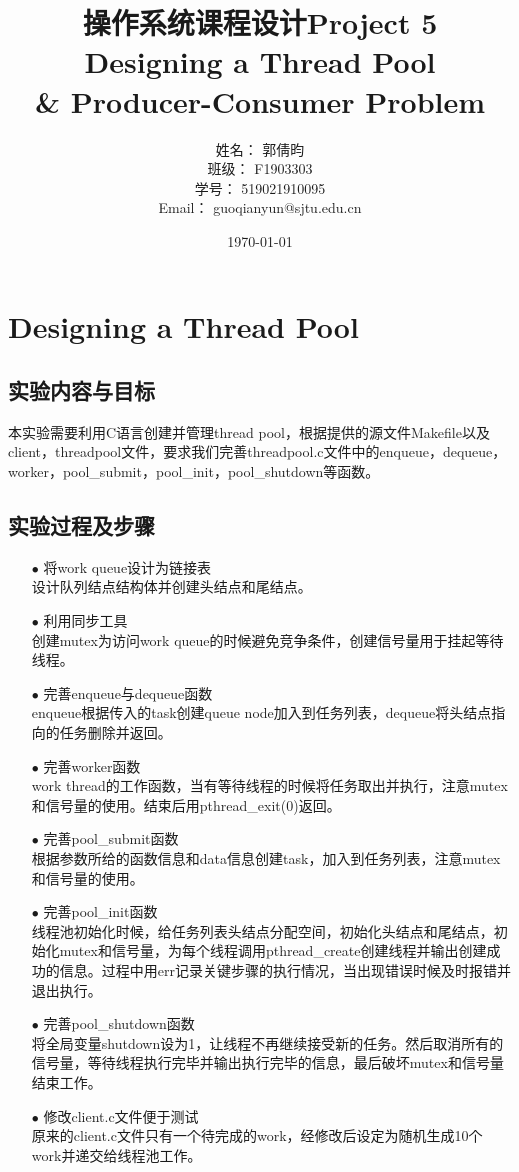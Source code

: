 \documentclass{article}
\title{\textbf{操作系统课程设计Project 5\\Designing a Thread Pool\\ \& Producer-Consumer Problem}} %
\author{姓名： 郭倩昀  
\\班级： F1903303  
\\学号： 519021910095  
\\Email： guoqianyun@sjtu.edu.cn} %
\date{\today} %
\begin{document}
\maketitle %
\tableofcontents
\newpage
\section{Designing a Thread Pool}
\subsection{实验内容与目标}
本实验需要利用C语言创建并管理thread pool，根据提供的源文件Makefile以及client，threadpool文件，要求我们完善threadpool.c文件中的enqueue，dequeue，worker，pool\_submit，pool\_init，pool\_shutdown等函数。
\subsection{实验过程及步骤}
\begin{itemize}
\item[$\bullet$]将work queue设计为链接表\\
设计队列结点结构体并创建头结点和尾结点。
\item[$\bullet$]利用同步工具\\
创建mutex为访问work queue的时候避免竞争条件，创建信号量用于挂起等待线程。
\item[$\bullet$]完善enqueue与dequeue函数\\
enqueue根据传入的task创建queue node加入到任务列表，dequeue将头结点指向的任务删除并返回。
\item[$\bullet$]完善worker函数\\
work thread的工作函数，当有等待线程的时候将任务取出并执行，注意mutex和信号量的使用。结束后用pthread\_exit(0)返回。
\item[$\bullet$]完善pool\_submit函数\\
根据参数所给的函数信息和data信息创建task，加入到任务列表，注意mutex和信号量的使用。
\item[$\bullet$]完善pool\_init函数\\
线程池初始化时候，给任务列表头结点分配空间，初始化头结点和尾结点，初始化mutex和信号量，为每个线程调用pthread\_create创建线程并输出创建成功的信息。过程中用err记录关键步骤的执行情况，当出现错误时候及时报错并退出执行。
\item[$\bullet$]完善pool\_shutdown函数\\
将全局变量shutdown设为1，让线程不再继续接受新的任务。然后取消所有的信号量，等待线程执行完毕并输出执行完毕的信息，最后破坏mutex和信号量结束工作。
\item[$\bullet$]修改client.c文件便于测试\\
原来的client.c文件只有一个待完成的work，经修改后设定为随机生成10个work并递交给线程池工作。
\end{itemize}
\end{document}
